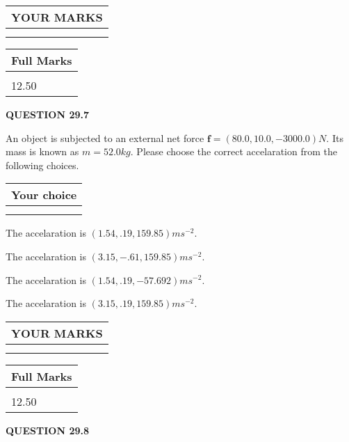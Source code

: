 \documentclass[12pt]{article}
\begin{document}
   
  
\vspace{0.2in}
  
\noindent\begin{tabular}{|l|}
\hline
 YOUR MARKS  \\
\hline
 \\ 
 \\ 
\hline
\end{tabular}
\hspace{0.05in} \begin{tabular}{|l|}
\hline
 Full Marks  \\
\hline
 \\ 
12.50 \\
\hline
\end{tabular}
{\textbf{\Large{QUESTION
29.7 
}}}
  
  
 
An object is subjected to an external net force $\mathbf{f}=
(80.0 , 10.0 , -3000.0) N$.
Its mass is known as $m= %
52.0 kg$.
Please choose the correct accelaration from the following choices.
  
  
\noindent\hspace{3.0in} \begin{tabular}{|l|}
\hline
Your choice \\
\hline
 \\ 
 \\ 
\hline
\end{tabular}
  
  
 
 
  The accelaration is $  %
(
1.54,
.19,
159.85)
ms^{-2} $.
 
 
  The accelaration is $  %
(
3.15,
-.61,
159.85)
ms^{-2} $.
 
 
  The accelaration is $  %
(
1.54,
.19,
-57.692)
ms^{-2} $.
 
 
  The accelaration is $  %
(
3.15,
.19,
159.85)
ms^{-2} $.
 
 
 

 
 
\vspace{0.3in}
  
\vspace{0.2in}
  
\noindent\begin{tabular}{|l|}
\hline
 YOUR MARKS  \\
\hline
 \\ 
 \\ 
\hline
\end{tabular}
\hspace{0.05in} \begin{tabular}{|l|}
\hline
 Full Marks  \\
\hline
 \\ 
12.50 \\
\hline
\end{tabular}
{\textbf{\Large{QUESTION
29.8 
}}}
  
\end{document}
